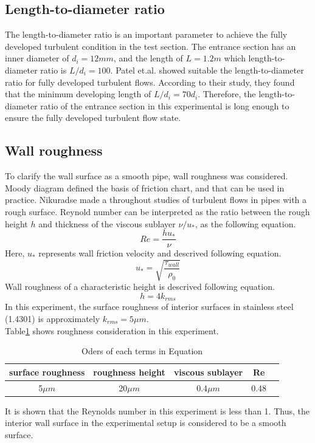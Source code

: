 \documentclass[conference]{IEEEtran}
\begin{document}
\subsection{Length-to-diameter ratio}
The length-to-diameter ratio is an important parameter to achieve the fully developed turbulent condition in the test section.
The entrance section has an inner diameter of $d_{i}=12mm$, and the length of $L=1.2m$ which length-to-diameter ratio is $L/d_{i}=100$.
Patel et.al.\cite{Zanoun2009} showed suitable the length-to-diameter ratio for fully developed turbulent flows.
According to their study, they found that the minimum developing length of $L/d_{i}=70d_{i}$.
Therefore, the length-to-diameter ratio of the entrance section in this experimental is long enough to ensure the fully developed turbulent flow state.


\subsection{Wall roughness}
To clarify the wall surface as a smooth pipe, wall roughness was considered.
Moody diagram defined the basis of friction chart, and that can be used in practice.
Nikuradse made a throughout studies of turbulent flows in pipes with a rough surface.
Reynold number can be interpreted as the ratio between the rough height $h$ and thickness of the viscous sublayer $\nu/u_{*}$, as the following equation.
\begin{equation}
    Re=\frac{hu_{*}}{\nu}
\end{equation}
Here, $u_{*}$ represents wall friction velocity and descrived following equation.
\begin{equation}
    u_{*}=\sqrt{\frac{\tau_{wall}}{\rho_{0}}}
\end{equation}
Wall roughness of a characteristic height is descrived following equation.
\begin{equation}
    h = 4k_{rms}
\end{equation}
In this experiment, the surface roughness of interior surfaces in stainless steel (1.4301) is approximately $k_{rms} = 5\mu m$.\\
Table\ref{wall_roughness} shows roughness consideration in this experiment.
\begin{table}[h]
    \caption{Oders of each terms in Equation}
    \label{wall_roughness}
    \centering
    \begin{tabular}{ccccc}
        \hline
        surface roughness & roughness height & viscous sublayer & Re \\
        \hline
        5$\mu m$ & 20$\mu m$ & 0.4$\mu m$ & 0.48
    \end{tabular}
\end{table}
It is shown that the Reynolds number in this experiment is less than 1.
Thus, the interior wall surface in the experimental setup is considered to be a smooth surface.
\end{document}
